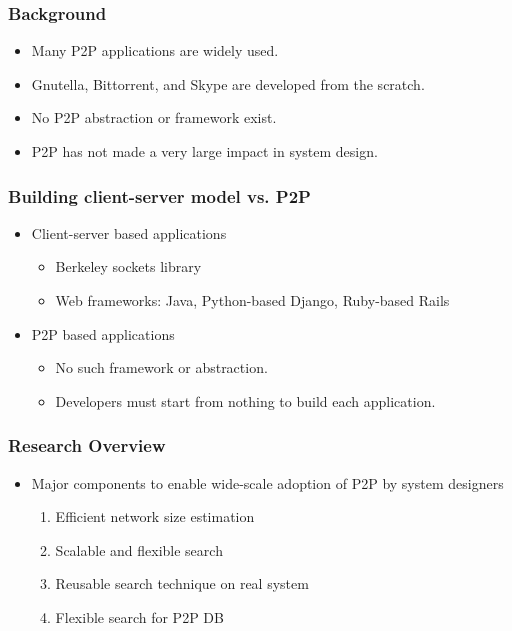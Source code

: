 \documentclass[red]{beamer}
\begin{document}
\begin{frame}
\frametitle{Background}
\begin{itemize}
\item Many P2P applications are widely used.
\item Gnutella, Bittorrent, and Skype are developed from the scratch.
\item No P2P abstraction or framework exist.
\item P2P has not made a very large impact in system design.
\end{itemize}
\end{frame}
\begin{frame}
\frametitle{Building client-server model vs. P2P}
\begin{itemize}
\item Client-server based applications
\begin{itemize}
\item Berkeley sockets library
\item Web frameworks: Java, Python-based Django, Ruby-based Rails
\end{itemize}
\item P2P based applications
\begin{itemize}
\item No such framework or abstraction.
\item Developers must start from nothing to build each application. 
\end{itemize}
\end{itemize}
\end{frame}
\begin{frame}
\frametitle{Research Overview}
\begin{itemize}
\item Major components to enable wide-scale adoption of P2P by system designers
\begin{enumerate}
\item Efficient network size estimation
\item Scalable and flexible search
\item Reusable search technique on real system
\item Flexible search for P2P DB
\end{enumerate}
\end{itemize}
\end{frame}
\end{document}
